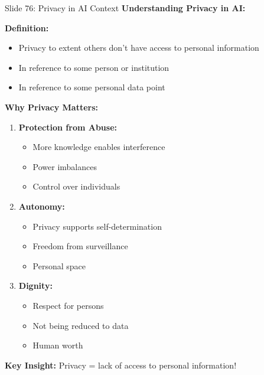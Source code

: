 \documentclass[8pt]{beamer}
\begin{document}
	\begin{frame}{Slide 76: Privacy in AI Context}
		\fontsize{6.5}{7.5}\selectfont
		\textbf{Understanding Privacy in AI:}
		
		\vspace{0.1cm}
		\textbf{Definition:}
		\begin{itemize}
			\item Privacy to extent others don't have access to personal information
			\item In reference to some person or institution
			\item In reference to some personal data point
		\end{itemize}
		
		\vspace{0.1cm}
		\textbf{Why Privacy Matters:}
		\begin{enumerate}
			\item \textbf{Protection from Abuse:}
			\begin{itemize}
				\item More knowledge enables interference
				\item Power imbalances
				\item Control over individuals
			\end{itemize}
			\item \textbf{Autonomy:}
			\begin{itemize}
				\item Privacy supports self-determination
				\item Freedom from surveillance
				\item Personal space
			\end{itemize}
			\item \textbf{Dignity:}
			\begin{itemize}
				\item Respect for persons
				\item Not being reduced to data
				\item Human worth
			\end{itemize}
		\end{enumerate}
		
		\textcolor{myblue}{\textbf{Key Insight:}} Privacy = \textcolor{myblue}{lack of access to personal information}!
	\end{frame}
	
\end{document}

